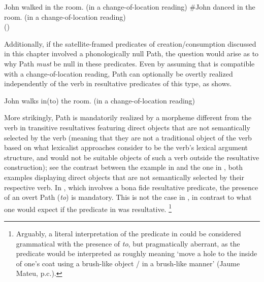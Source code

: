\documentclass[output=paper,colorlinks,citecolor=brown]{langscibook}
\begin{document}
\ea \label{walkdance} \ea \label{walkalexiadou} John walked in the room. \hfill (in a change-of-location reading)
\ex $\#$John danced in the room. \hfill (in a change-of-location reading)\\ \hfill (\citealt[1093]{Alexiadou2015}) \z \z

\noindent Additionally, if the satellite-framed predicates of creation/consumption discussed in this chapter involved a phonologically null Path, the question would arise as to why Path \textit{must} be null in these predicates. Even by assuming that  is compatible with a change-of-location reading, Path can optionally be overtly realized independently of the verb in resultative predicates of this type, as  shows.

\ea \label{walkininto} John walks in(to) the room. \hfill (in a change-of-location reading) \z

\noindent More strikingly, Path is mandatorily realized by a morpheme different from the verb in transitive resultatives featuring direct objects that are not semantically selected by the verb (meaning that they are not a traditional object of the verb based on what lexicalist approaches consider to be the verb's lexical argument structure, and would not be suitable objects of such a verb outside the resultative construction); see the contrast between the example in  and the one in , both examples displaying direct objects that are not semantically selected by their respective verb. %
In , which involves a bona fide resultative predicate, the presence of an overt Path (\textit{to}) is mandatory. This is not the case in , in contrast to what one would expect if the predicate in  was resultative.%
\footnote{Arguably, a literal interpretation of the predicate in  could be considered grammatical with the presence of \textit{to}, but pragmatically aberrant, as the predicate would be interpreted as roughly meaning `move a hole to the inside of one's coat using a brush-like object / in a brush-like manner' (Jaume Mateu, p.c.).%
}
\end{document}
